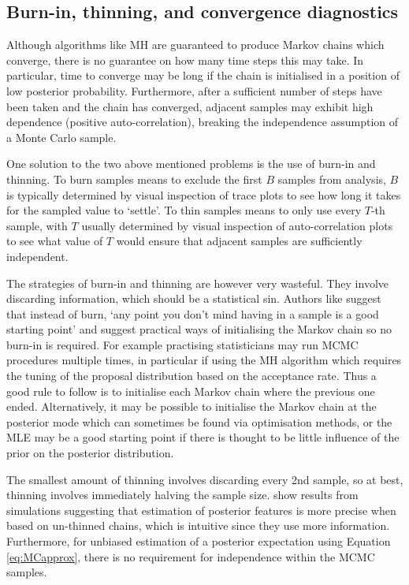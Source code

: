 \subsection{Burn-in, thinning, and convergence diagnostics}

Although algorithms like \gls{MH} are guaranteed to produce Markov chains which converge, there is no guarantee on how
many time steps this may take. In particular, time to converge may be long if the chain is initialised in a position of
low posterior probability. Furthermore, after a sufficient number of steps have been taken and the chain has converged,
adjacent samples may exhibit high dependence (positive auto-correlation), breaking the independence assumption of a
Monte Carlo sample.

One solution to the two above mentioned problems is the use of burn-in and thinning. To burn samples means to exclude
the first \(B\) samples from analysis, \(B\) is typically determined by visual inspection of trace plots to see how long
it takes for the sampled value to `settle'. To thin samples means to only use every \(T\)-th sample, with \(T\) usually
determined by visual inspection of auto-correlation plots to see what value of \(T\) would ensure that adjacent samples
are sufficiently independent.

The strategies of burn-in and thinning are however very wasteful. They involve discarding information, which should be a
statistical sin. Authors like \cite{geyer2011} suggest that instead of burn, `any point you don't mind having in a
sample is a good starting point' and suggest practical ways of initialising the Markov chain so no burn-in is required.
For example practising statisticians may run \gls{MCMC} procedures multiple times, in particular if using the \gls{MH}
algorithm which requires the tuning of the proposal distribution based on the acceptance rate. Thus a good rule to
follow is to initialise each Markov chain where the previous one ended. Alternatively, it may be possible to initialise
the Markov chain at the posterior mode which can sometimes be found via optimisation methods, or the \gls{MLE} may be a
good starting point if there is thought to be little influence of the prior on the posterior distribution.

The smallest amount of thinning involves discarding every 2nd sample, so at best, thinning involves immediately halving
the sample size. \cite{link2012} show results from simulations suggesting that estimation of posterior features is more
precise when based on un-thinned chains, which is intuitive since they use more information. Furthermore, for unbiased
estimation of a posterior expectation using Equation \eqref{eq:MCapprox}, there is no requirement for independence
within the \gls{MCMC} samples.

